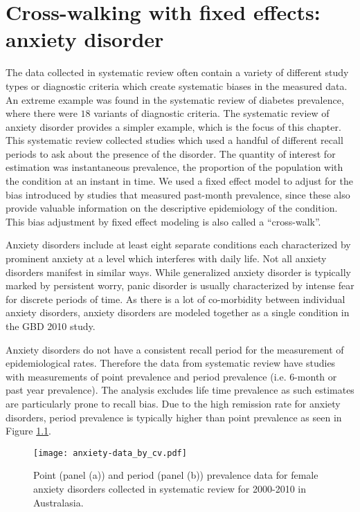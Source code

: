 \chapter{Cross-walking with fixed effects: anxiety disorder}
\label{applications-efx_study_level}

The data collected in systematic review often contain a variety of
different study types or diagnostic criteria which create systematic
biases in the measured data.  An extreme example was found in the
systematic review of diabetes prevalence, where there were $18$ variants
of diagnostic criteria.  The systematic review of anxiety disorder
provides a simpler example, which is the focus of this chapter. This
systematic review collected studies which used a handful of different
recall periods to ask about the presence of the disorder. The quantity
of interest for estimation was instantaneous prevalence, the
proportion of the population with the condition at an instant in time.
We used a fixed effect model to adjust for the bias introduced by
studies that measured past-month prevalence, since these also provide
valuable information on the descriptive epidemiology of the condition.
This bias adjustment by fixed effect modeling is also called a
``cross-walk''.

Anxiety disorders include at least eight separate conditions each
characterized by prominent anxiety at a level which interferes with
daily life.  Not all anxiety disorders manifest in similar ways.
While generalized anxiety disorder is typically marked by persistent
worry, panic disorder is usually characterized by intense fear for
discrete periods of time. \cite{american_psychiatric_association_diagnostic_2000} As there is
a lot of co-morbidity between individual anxiety disorders, anxiety
disorders are modeled together as a single condition in the GBD 2010
study.

Anxiety disorders do not have a consistent recall period for the
measurement of epidemiological rates.  Therefore the data from
systematic review have studies with measurements of point prevalence
and period prevalence (i.e. 6-month or past year prevalence).  The
analysis excludes life time prevalence as such estimates are
particularly prone to recall bias.  Due to the high remission rate for
anxiety disorders, period prevalence is typically higher than point
prevalence as seen in Figure \ref{fig:app-anxiety data}.

    \begin{figure}[h]
        \begin{center}
            \texttt{[image: anxiety-data\_by\_cv.pdf]}
            \caption{Point (panel (a)) and period (panel (b)) prevalence data
              for female anxiety disorders collected in systematic review for
              2000-2010 in Australasia.}
            \label{fig:app-anxiety data}
        \end{center}
    \end{figure}


